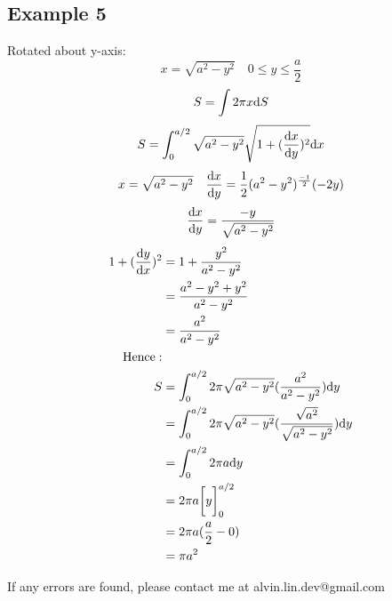 \documentclass[letterpaper, 12pt]{math}
\begin{document}
\subsection*{Example 5}
Rotated about y-axis:
\[ x = \sqrt{a^{2}-y^{2}} \quad 0 \leq y \leq \frac{a}{2} \]
\[ S = \int{2\pi x\mathrm{d}{S}} \]
\[ S = \int_{0}^{a/2}{
   \sqrt{a^{2}-y^{2}}\sqrt{1+(\frac{\mathrm{d}{x}}{\mathrm{d}{y}})^{2}}\mathrm{d}{x}} \]
\[ x = \sqrt{a^{2}-y^{2}} \quad
   \frac{\mathrm{d}{x}}{\mathrm{d}{y}} = \frac{1}{2}(a^{2}-y^{2})^{\frac{-1}{2}}(-2y) \]
\[ \frac{\mathrm{d}{x}}{\mathrm{d}{y}} = \frac{-y}{\sqrt{a^{2}-y^{2}}} \]
\begin{align*}
  1+(\frac{\mathrm{d}{y}}{\mathrm{d}{x}})^{2} &=
    1+\frac{y^{2}}{a^{2}-y^{2}} \\
  &= \frac{a^{2}-y^{2}+y^{2}}{a^{2}-y^{2}} \\
  &= \frac{a^{2}}{a^{2}-y^{2}} \\
  \mathrm{Hence:} \\
  S &= \int_{0}^{a/2}{
    2\pi\sqrt{a^{2}-y^{2}}(\frac{a^{2}}{a^{2}-y^{2}})\mathrm{d}{y}} \\
  &= \int_{0}^{a/2}{
    2\pi\sqrt{a^{2}-y^{2}}(\frac{\sqrt{a^{2}}}{\sqrt{a^{2}-y^{2}}})\mathrm{d}{y}} \\
  &= \int_{0}^{a/2}{2\pi a\mathrm{d}{y}} \\
  &= 2\pi a\bigg[y\bigg]_{0}^{a/2} \\
  &= 2\pi a(\frac{a}{2}-0) \\
  &= \pi a^{2}
\end{align*}

\begin{center}
  If any errors are found, please contact me at alvin.lin.dev@gmail.com
\end{center}
\end{document}
